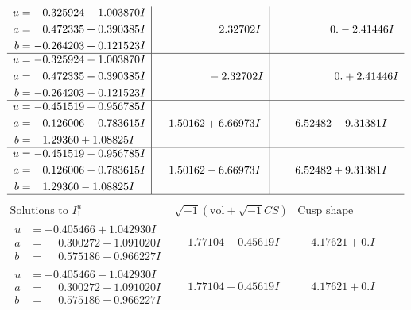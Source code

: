 \documentclass[1p]{elsarticle_modified}
\theoremstyle{definition}
\newcommand{\I}{\sqrt{-1}}
\begin{document}
$$\begin{array}{c|c|c}
\begin{aligned}
u &= -0.325924 + 1.003870 I \\
a &= \phantom{-}0.472335 + 0.390385 I \\
b &= -0.264203 + 0.121523 I\end{aligned}
 & \phantom{-0.000000 -}2.32702 I & \phantom{-0.000000 } 0. - 2.41446 I \\ \hline\begin{aligned}
u &= -0.325924 - 1.003870 I \\
a &= \phantom{-}0.472335 - 0.390385 I \\
b &= -0.264203 - 0.121523 I\end{aligned}
 & \phantom{-0.000000 } -2.32702 I & \phantom{-0.000000 -}0. + 2.41446 I \\ \hline\begin{aligned}
u &= -0.451519 + 0.956785 I \\
a &= \phantom{-}0.126006 + 0.783615 I \\
b &= \phantom{-}1.29360 + 1.08825 I\end{aligned}
 & \phantom{-}1.50162 + 6.66973 I & \phantom{-}6.52482 - 9.31381 I \\ \hline\begin{aligned}
u &= -0.451519 - 0.956785 I \\
a &= \phantom{-}0.126006 - 0.783615 I \\
b &= \phantom{-}1.29360 - 1.08825 I\end{aligned}
 & \phantom{-}1.50162 - 6.66973 I & \phantom{-}6.52482 + 9.31381 I\\
 \hline 
 \end{array}$$\newpage$$\begin{array}{c|c|c}  
\text{Solutions to }I^u_{1}& \I (\text{vol} + \sqrt{-1}CS) & \text{Cusp shape}\\
 \hline 
\begin{aligned}
u &= -0.405466 + 1.042930 I \\
a &= \phantom{-}0.300272 + 1.091020 I \\
b &= \phantom{-}0.575186 + 0.966227 I\end{aligned}
 & \phantom{-}1.77104 - 0.45619 I & \phantom{-}4.17621 + 0. I\phantom{ +0.000000I} \\ \hline\begin{aligned}
u &= -0.405466 - 1.042930 I \\
a &= \phantom{-}0.300272 - 1.091020 I \\
b &= \phantom{-}0.575186 - 0.966227 I\end{aligned}
 & \phantom{-}1.77104 + 0.45619 I & \phantom{-}4.17621 + 0. I\phantom{ +0.000000I} \\ \hline\begin{aligned}

\end{aligned}
\end{array}$$
\end{document}
